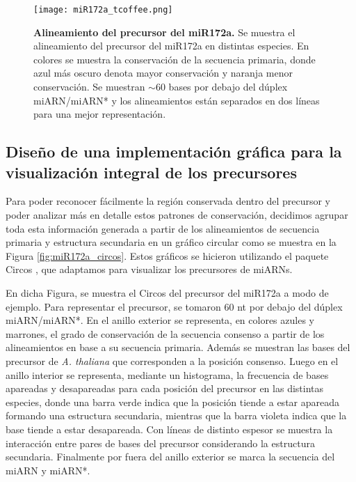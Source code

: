 \begin{landscape}
    \begin{figure}[htbp!] 
        \centering    
        \texttt{[image: miR172a\_tcoffee.png]}
        \caption[Alineamiento del precursor del miR172a.]{
        \textbf{Alineamiento del precursor del miR172a.}
        Se muestra el alineamiento del precursor del miR172a en distintas especies. 
        En colores se muestra la conservación de la secuencia primaria, donde azul más oscuro denota mayor conservación y naranja menor conservación.
        Se muestran $\sim$60 bases por debajo del dúplex miARN/miARN* y los alineamientos están separados en dos líneas para una mejor representación.}
         \label{fig:miR172a_tcoffee}
    \end{figure}
\end{landscape}




\subsection{Diseño de una implementación gráfica para la visualización integral de los precursores}

Para poder reconocer fácilmente la región conservada dentro del precursor y poder analizar más en detalle estos patrones de conservación, decidimos agrupar toda esta información 
generada a partir de los alineamientos de secuencia primaria y estructura secundaria en un gráfico circular como se muestra en la Figura \ref{fig:miR172a_circos}.
Estos gráficos se hicieron utilizando el paquete Circos \citep{pmid19541911}, que adaptamos para visualizar los precursores de miARNs.
 
En dicha Figura, se muestra el Circos del precursor del miR172a a modo de ejemplo.
Para representar el precursor, se tomaron 60 nt por debajo del dúplex miARN/miARN*.
En el anillo exterior se representa, en colores azules y marrones, el grado de conservación de la secuencia consenso a partir de los alineamientos en base a su secuencia primaria.
Además se muestran las bases del precursor de \textit {A. thaliana} que corresponden a la posición consenso.
Luego en el anillo interior se representa, mediante un histograma, la frecuencia de bases apareadas y desapareadas para cada posición del precursor en las distintas especies, donde una barra verde indica que la posición tiende a estar apareada formando una estructura secundaria, mientras que la barra violeta indica que la base tiende a estar desapareada. 
Con líneas de distinto espesor se muestra la interacción entre pares de bases del precursor considerando la estructura secundaria. 
Finalmente por fuera del anillo exterior se marca la secuencia del miARN y miARN*.


